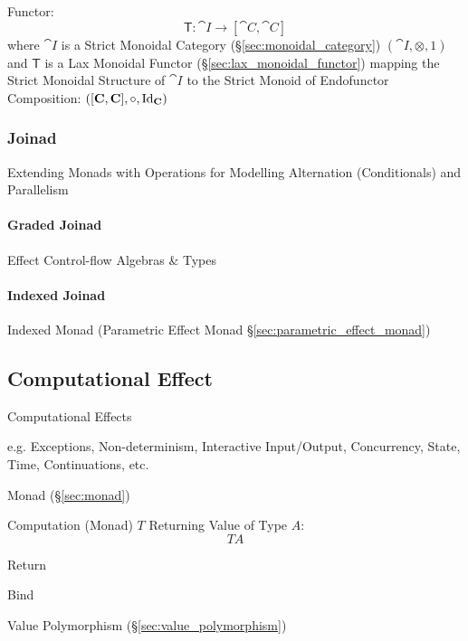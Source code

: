 Functor:
\[
  \mathsf{T} : \cat{I} \rightarrow [\cat{C},\cat{C}]
\]
where $\cat{I}$ is a Strict Monoidal Category
(\S\ref{sec:monoidal_category}) $(\cat{I}, \otimes, 1)$ and
$\mathsf{T}$ is a Lax Monoidal Functor
(\S\ref{sec:lax_monoidal_functor}) mapping the Strict Monoidal
Structure of $\cat{I}$ to the Strict Monoid of Endofunctor
Composition: $([\mathbf{C},\mathbf{C}],\circ,\mathrm{Id}_\mathbf{C})$



\subsubsection{Joinad}\label{sec:joinad}

Extending Monads with Operations for Modelling Alternation
(Conditionals) and Parallelism



\paragraph{Graded Joinad}\label{sec:graded_joinad}\hfill

Effect Control-flow Algebras \& Types



\paragraph{Indexed Joinad}\label{sec:indexed_joinad}\hfill

Indexed Monad (Parametric Effect Monad
\S\ref{sec:parametric_effect_monad})



\subsection{Computational Effect}\label{sec:computational_effect}

Computational Effects

e.g. Exceptions, Non-determinism, Interactive Input/Output,
Concurrency, State, Time, Continuations, etc. \cite{plotkin-pretnar09}

Monad (\S\ref{sec:monad})

Computation (Monad) $T$ Returning Value of Type $A$:
\[
  T A
\]

Return

Bind

Value Polymorphism (\S\ref{sec:value_polymorphism})

